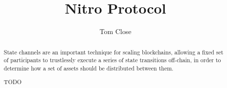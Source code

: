 \documentclass{article}
\title{Nitro Protocol}
\author{Tom Close}
\begin{document}
\maketitle
\begin{abstract}
  State channels are an important technique for scaling blockchains, allowing a fixed set of participants to trustlessly execute a series of state transitions off-chain, in order to determine how a set of assets should be distributed between them.

   TODO
\end{abstract}

















\end{document}
